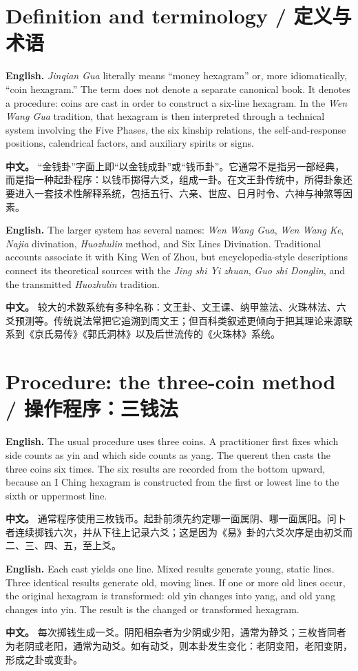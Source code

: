 \documentclass[11pt]{article}
\newcommand{\EN}[1]{\textcolor{labelgray}{\textbf{English.}} #1}
\newcommand{\CN}[1]{\textcolor{labelgray}{\textbf{中文。}} #1}
\newcommand{\bipar}[2]{\EN{#1}\par\CN{#2}\par\medskip}
\begin{document}
\section{Definition and terminology / 定义与术语}
\bipar{\textit{Jinqian Gua} literally means ``money hexagram'' or, more idiomatically, ``coin hexagram.'' The term does not denote a separate canonical book. It denotes a procedure: coins are cast in order to construct a six-line hexagram. In the \textit{Wen Wang Gua} tradition, that hexagram is then interpreted through a technical system involving the Five Phases, the six kinship relations, the self-and-response positions, calendrical factors, and auxiliary spirits or signs.}{“金钱卦”字面上即“以金钱成卦”或“钱币卦”。它通常不是指另一部经典，而是指一种起卦程序：以钱币掷得六爻，组成一卦。在文王卦传统中，所得卦象还要进入一套技术性解释系统，包括五行、六亲、世应、日月时令、六神与神煞等因素。}
\bipar{The larger system has several names: \textit{Wen Wang Gua}, \textit{Wen Wang Ke}, \textit{Najia} divination, \textit{Huozhulin} method, and Six Lines Divination. Traditional accounts associate it with King Wen of Zhou, but encyclopedia-style descriptions connect its theoretical sources with the \textit{Jing shi Yi zhuan}, \textit{Guo shi Donglin}, and the transmitted \textit{Huozhulin} tradition.}{较大的术数系统有多种名称：文王卦、文王课、纳甲筮法、火珠林法、六爻预测等。传统说法常把它追溯到周文王；但百科类叙述更倾向于把其理论来源联系到《京氏易传》《郭氏洞林》以及后世流传的《火珠林》系统。}

\section{Procedure: the three-coin method / 操作程序：三钱法}
\bipar{The usual procedure uses three coins. A practitioner first fixes which side counts as yin and which side counts as yang. The querent then casts the three coins six times. The six results are recorded from the bottom upward, because an I Ching hexagram is constructed from the first or lowest line to the sixth or uppermost line.}{通常程序使用三枚钱币。起卦前须先约定哪一面属阴、哪一面属阳。问卜者连续掷钱六次，并从下往上记录六爻；这是因为《易》卦的六爻次序是由初爻而二、三、四、五，至上爻。}
\bipar{Each cast yields one line. Mixed results generate young, static lines. Three identical results generate old, moving lines. If one or more old lines occur, the original hexagram is transformed: old yin changes into yang, and old yang changes into yin. The result is the changed or transformed hexagram.}{每次掷钱生成一爻。阴阳相杂者为少阴或少阳，通常为静爻；三枚皆同者为老阴或老阳，通常为动爻。如有动爻，则本卦发生变化：老阴变阳，老阳变阴，形成之卦或变卦。}
\end{document}
